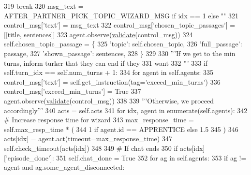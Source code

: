 \begin{DoxyCode}
319                                 \textcolor{keywordflow}{break}
320                     msg\_text = AFTER\_PARTNER\_PICK\_TOPIC\_WIZARD\_MSG \textcolor{keywordflow}{if} idx == 1 \textcolor{keywordflow}{else} \textcolor{stringliteral}{""}
321                     control\_msg[\textcolor{stringliteral}{'text'}] = msg\_text
322                     control\_msg[\textcolor{stringliteral}{'chosen\_topic\_passages'}] = [[title, sentences]]
323                     agent.observe(\hyperlink{namespaceparlai_1_1core_1_1worlds_afc3fad603b7bce41dbdc9cdc04a9c794}{validate}(control\_msg))
324                     self.chosen\_topic\_passage = \{
325                         \textcolor{stringliteral}{'topic'}: self.chosen\_topic,
326                         \textcolor{stringliteral}{'full\_passage'}: passage,
327                         \textcolor{stringliteral}{'shown\_passage'}: sentences,
328                     \}
329 
330         \textcolor{stringliteral}{'''If we get to the min turns, inform turker that they can end if they}
331 \textcolor{stringliteral}{           want}
332 \textcolor{stringliteral}{        '''}
333         \textcolor{keywordflow}{if} self.turn\_idx == self.num\_turns + 1:
334             \textcolor{keywordflow}{for} agent \textcolor{keywordflow}{in} self.agents:
335                 control\_msg[\textcolor{stringliteral}{'text'}] = self.get\_instruction(tag=\textcolor{stringliteral}{'exceed\_min\_turns'})
336                 control\_msg[\textcolor{stringliteral}{'exceed\_min\_turns'}] = \textcolor{keyword}{True}
337                 agent.observe(\hyperlink{namespaceparlai_1_1core_1_1worlds_afc3fad603b7bce41dbdc9cdc04a9c794}{validate}(control\_msg))
338 
339         \textcolor{stringliteral}{'''Otherwise, we proceed accordingly'''}
340         acts = self.acts
341         \textcolor{keywordflow}{for} idx, agent \textcolor{keywordflow}{in} enumerate(self.agents):
342             \textcolor{comment}{# Increase response time for wizard}
343             max\_response\_time = self.max\_resp\_time * (
344                 1 \textcolor{keywordflow}{if} agent.id == APPRENTICE \textcolor{keywordflow}{else} 1.5
345             )
346             acts[idx] = agent.act(timeout=max\_response\_time)
347             self.check\_timeout(acts[idx])
348 
349             \textcolor{comment}{# If chat ends}
350             \textcolor{keywordflow}{if} acts[idx][\textcolor{stringliteral}{'episode\_done'}]:
351                 self.chat\_done = \textcolor{keyword}{True}
352                 \textcolor{keywordflow}{for} ag \textcolor{keywordflow}{in} self.agents:
353                     \textcolor{keywordflow}{if} ag != agent \textcolor{keywordflow}{and} ag.some\_agent\_disconnected:

\end{DoxyCode}
